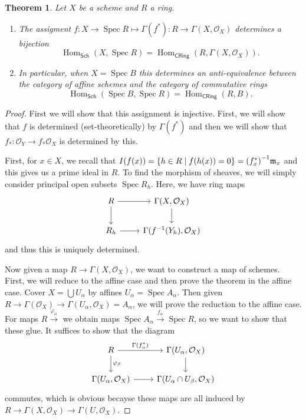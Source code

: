 \documentclass[leqno, openany]{memoir}
\newtheorem{thm}{Theorem}[section]
\theoremstyle{definition}
\theoremstyle{remark}
\theoremstyle{plain}
\theoremstyle{definition}
\theoremstyle{remark}
\newcommand{\mc}[1]{\mathcal{#1}}
\newcommand{\mf}[1]{\mathfrak{#1}}
\newcommand{\ms}[1]{\mathsf{#1}}
\DeclareMathOperator{\Hom}{Hom}
\DeclareMathOperator{\Spec}{Spec}
\begin{document}
\begin{thm} Let $X$ be a scheme and $R$ a ring.  \begin{enumerate} \item The
    assigment $f \colon X \to \Spec R \mapsto \Gamma(f^*) \colon R \to
    \Gamma(X, \mc{O}_X)$ determines a bijection \[ \Hom_{\ms{Sch}}(X, \Spec R)
    = \Hom_{\ms{CRing}}(R, \Gamma(X, \mc{O}_X)). \] \item In particular, when
    $X = \Spec B$ this determines an anti-equivalence between the category of
    affine schemes and the category of commutative rings \[
    \Hom_{\ms{Sch}}(\Spec B, \Spec R) = \Hom_{\ms{CRing}}(R, B). \]
    \end{enumerate} \end{thm}

\begin{proof} First we will show that this assignment is injective. First, we
    will show that $f$ is determined (set-theoretically) by $\Gamma(f^*)$ and
    then we will show that $f_* \colon \mc{O}_Y \to f_* \mc{O}_X$ is determined
    by this.

    First, for $x \in X$, we recall that $I(f(x)) = \qty{h \in R \mid f(h(x)) =
    0} = { (f_x^*) }^{-1} \mf{m}_x$ and this gives us a prime ideal in $R$. To
    find the morphism of sheaves, we will simply consider principal open
    subsets $\Spec R_h$. Here, we have ring maps \begin{equation*}
        \begin{tikzcd} R \arrow{r} \arrow{d} & \Gamma(X, \mc{O}_X) \arrow{d} \\
        R_h \arrow{r} & \Gamma (f^{-1}(Y_h), \mc{O}_X) \end{tikzcd}
        \end{equation*} and thus this is uniquely determined.

    Now given a map $R \to \Gamma(X, \mc{O}_X)$, we want to construct a map of
    schemes. First, we will reduce to the affine case and then prove the
    theorem in the affine case. Cover $X = \bigcup U_{\alpha}$ by affines
    $U_{\alpha} = \Spec A_{\alpha}$. Then given $R \to \Gamma(\mc{O}_X) \to
    \Gamma(U_{\alpha}, \mc{O}_X) = A_{\alpha}$, we will prove the reduction to
    the affine case. For maps $R \xrightarrow{\varphi_{\alpha}}$ we obtain maps
    $\Spec A_{\alpha} \xrightarrow{f_{\alpha}} \Spec R$, so we want to show
    that these glue. It suffices to show that the diagram \begin{equation*}
        \begin{tikzcd} R \arrow{r}{\Gamma(f_{\alpha}^*)}
            \arrow{d}{\varphi_{\beta}} & \Gamma(U_{\alpha}, \mc{O}_X) \arrow{d}
            \\ \Gamma(U_{\alpha}, \mc{O}_X) \arrow{r} & \Gamma(U_{\alpha} \cap
            U_{\beta}, \mc{O}_X) \end{tikzcd} \end{equation*} commutes, which
            is obvious becayse these maps are all induced by $R \to \Gamma(X,
            \mc{O}_X) \to \Gamma(U, \mc{O}_X)$.


\end{proof}
\end{document}
